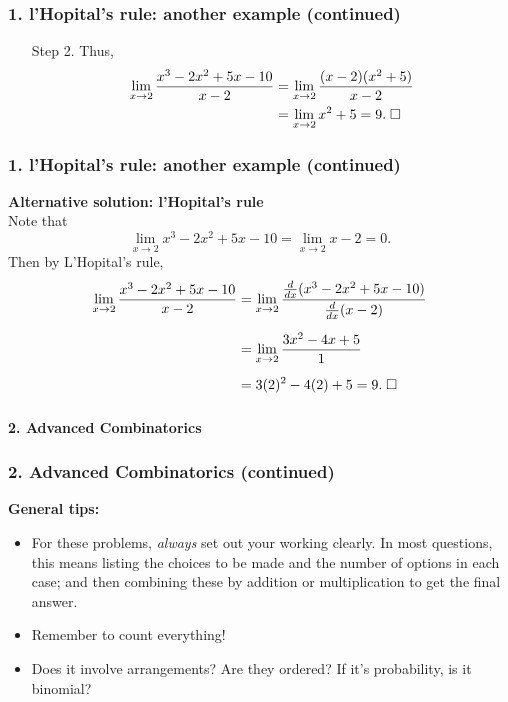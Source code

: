 \documentclass{beamer}
\begin{document}


\begin{frame}
\frametitle{1. l'Hopital's rule: another example (continued)}

\begin{enumerate}
\item[Step 2. ] Thus,
\begin{align*}
\lim_{x\rightarrow 2} \frac{ x^3 - 2x^2 + 5x - 10 }{ x-2 } &= \lim_{x\rightarrow 2} \frac{ (x-2)(x^2 + 5)}{ x-2 } \\
&=  \lim_{x\rightarrow 2} x^2 + 5 = 9. \thickspace \Box
\end{align*}
\end{enumerate}	


\end{frame}


\begin{frame}
\frametitle{1. l'Hopital's rule: another example (continued)}

 {\bf Alternative solution: l'Hopital's rule}\\[2mm]
 Note that 
 \[
 \lim_{x\rightarrow 2}{ x^3 - 2x^2 + 5x - 10 } =  \lim_{x\rightarrow 2} x -2 = 0.
 \]
 Then by L'Hopital's rule,
 \begin{align*}
 \lim_{x\rightarrow 2} \frac{ x^3 - 2x^2 + 5x - 10 }{ x-2 } &= \lim_{x\rightarrow 2} \frac{ \frac{d}{dx} ( x^3 - 2x^2 + 5x - 10 )}{\frac{d}{dx} (x-2) }\\[2mm]
 &=  \lim_{x\rightarrow 2} \frac{ 3x^2 -4x +5 }{ 1 }\\[2mm]
 &= 3(2)^2 - 4(2) + 5= 9. \thickspace \Box
 \end{align*}

\end{frame}



\begin{frame}
	\frametitle{}
{\bf \LARGE 2. Advanced Combinatorics}

\end{frame}



\begin{frame}
\frametitle{2. Advanced Combinatorics (continued)}

{\bf General tips:}
\begin{itemize}
\item For these problems, {\it always} set out your working clearly. In most questions, this means listing the choices to be made and the number of options in each case; and then combining these by addition or multiplication to get the final answer.
\item Remember to count everything! 
\item  Does it involve arrangements? Are they ordered? If it's probability, is it binomial?
\end{itemize}



\end{frame}
\end{document}
